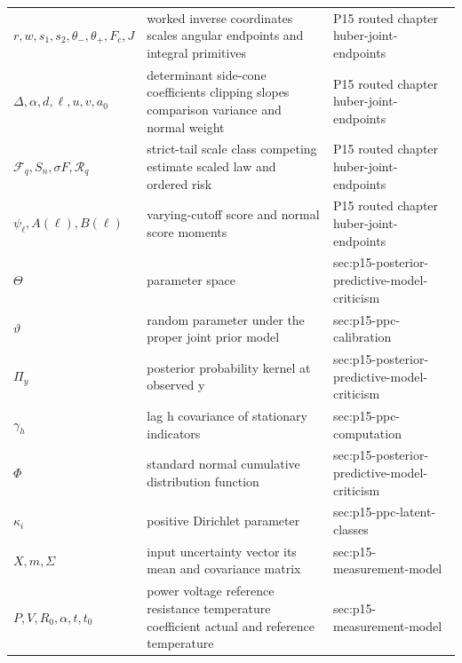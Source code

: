 \begin{longtable}{@{}p{}p{}p{}@{}}
\(r,\allowbreak w,\allowbreak s_1,\allowbreak s_2,\allowbreak \theta_-,\allowbreak \theta_+,\allowbreak F_c,\allowbreak J\) & worked inverse coordinates scales angular endpoints and integral primitives & P15 routed chapter huber-\allowbreak{}joint-\allowbreak{}endpoints \\
\(\Delta,\allowbreak \alpha,\allowbreak d,\allowbreak \ell,\allowbreak u,\allowbreak v,\allowbreak a_0\) & determinant side-cone coefficients clipping slopes comparison variance and normal weight & P15 routed chapter huber-\allowbreak{}joint-\allowbreak{}endpoints \\
\(\mathcal F_q,\allowbreak S_n,\allowbreak \sigma F,\allowbreak \mathcal R_q\) & strict-tail scale class competing estimate scaled law and ordered risk & P15 routed chapter huber-\allowbreak{}joint-\allowbreak{}endpoints \\
\(\psi_\ell,\allowbreak A(\ell),\allowbreak B(\ell)\) & varying-cutoff score and normal score moments & P15 routed chapter huber-\allowbreak{}joint-\allowbreak{}endpoints \\
\(\Theta\) & parameter space & sec:\allowbreak{}p15-\allowbreak{}posterior-\allowbreak{}predictive-\allowbreak{}model-\allowbreak{}criticism \\
\(\vartheta\) & random parameter under the proper joint prior model & sec:\allowbreak{}p15-\allowbreak{}ppc-\allowbreak{}calibration \\
\(\Pi_y\) & posterior probability kernel at observed y & sec:\allowbreak{}p15-\allowbreak{}posterior-\allowbreak{}predictive-\allowbreak{}model-\allowbreak{}criticism \\
\(\gamma_h\) & lag h covariance of stationary indicators & sec:\allowbreak{}p15-\allowbreak{}ppc-\allowbreak{}computation \\
\(\Phi\) & standard normal cumulative distribution function & sec:\allowbreak{}p15-\allowbreak{}posterior-\allowbreak{}predictive-\allowbreak{}model-\allowbreak{}criticism \\
\(\kappa_i\) & positive Dirichlet parameter & sec:\allowbreak{}p15-\allowbreak{}ppc-\allowbreak{}latent-\allowbreak{}classes \\
\(X,\allowbreak m,\allowbreak \Sigma\) & input uncertainty vector its mean and covariance matrix & sec:\allowbreak{}p15-\allowbreak{}measurement-\allowbreak{}model \\
\(P,\allowbreak V,\allowbreak R_0,\allowbreak \alpha,\allowbreak t,\allowbreak t_0\) & power voltage reference resistance temperature coefficient actual and reference temperature & sec:\allowbreak{}p15-\allowbreak{}measurement-\allowbreak{}model \\

\end{longtable}
